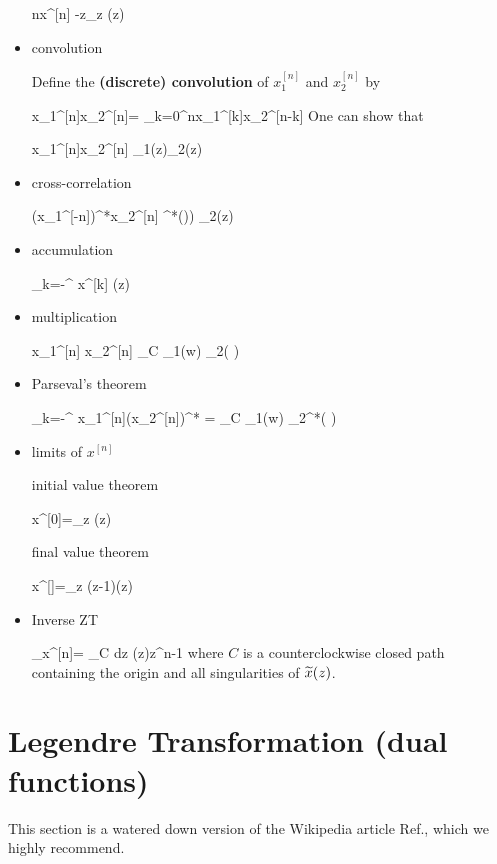 \begin{itemize}
\beq
nx^{[n]}
\maparrow{\calz}
-z\partial_z (z)
\eeq

\item convolution

Define the {\bf (discrete)
convolution}
of $x_1^{[n]}$
and $x_2^{[n]}$ by

\beq
x_1^{[n]}\circledast x_2^{[n]}=
\sum_{k=0}^nx_1^{[k]}x_2^{[n-k]}
\eeq
One can show that

\beq
x_1^{[n]}\circledast x_2^{[n]}
\maparrow{\calz}
_1(z)_2(z)
\eeq

\item cross-correlation

\beq
(x_1^{[-n]})^*\circledast x_2^{[n]}
\maparrow{\calz}
^*\left(\right))
_2(z)
\eeq

\item accumulation

\beq
\sum_{k=-\infty}^\infty
x^{[k]}
\maparrow{\calz}
(z)
\eeq

\item multiplication

\beq
x_1^{[n]} x_2^{[n]}
\maparrow{\calz}
\oint_C \;
_1(w)
_2\left(
{\color{red}}
\right)
\eeq

\item Parseval's theorem

\beq
\sum_{k=-\infty}^{\infty}
x_1^{[n]}(x_2^{[n]})^*
=
\oint_C \;
_1(w)
_2^*\left(
{\color{red}
}
\right)
\eeq

\item limits of $x^{[n]}$

initial value theorem

\beq
x^{[0]}=\lim_{z\rarrow \infty}
(z)
\eeq

final value theorem

\beq
x^{[\infty]}=\lim_{z}
(z-1)(z)
\eeq

\item Inverse ZT

\beq
{}
_{x^{[n]}}=
\oint_C dz\;
(z)z^{n-1}
\eeq
where $C$
is a counterclockwise
closed path
containing the origin and
all singularities
of ${\widetilde{x}}(z)$.

\end{itemize}


\section{Legendre Transformation (dual functions)}
\label{sec-dual-fun}
This section is a
watered down version of
the Wikipedia article
Ref.\cite{wiki-legendre-transformation},
which we highly recommend.



